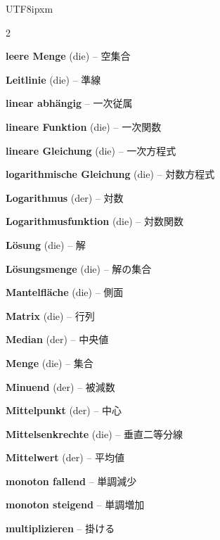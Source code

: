 \begin{CJK}{UTF8}{ipxm}
\begin{multicols}{2}
\par\nopagebreak
\textbf{leere Menge} (die) -- 空集合\dotfill\hyperref[e:104]{\pageref*{e:104}}\par
\textbf{Leitlinie} (die) -- 準線\dotfill\hyperref[e:318]{\pageref*{e:318}}\par
\textbf{linear abhängig} -- 一次従属\dotfill\hyperref[e:319]{\pageref*{e:319}}\par
\textbf{lineare Funktion} (die) -- 一次関数\dotfill\hyperref[e:119]{\pageref*{e:119}}\par
\textbf{lineare Gleichung} (die) -- 一次方程式\dotfill\hyperref[e:81]{\pageref*{e:81}}\par
\textbf{logarithmische Gleichung} (die) -- 対数方程式\dotfill\hyperref[e:85]{\pageref*{e:85}}\par
\textbf{Logarithmus} (der) -- 対数\dotfill\hyperref[e:95]{\pageref*{e:95}}\par
\textbf{Logarithmusfunktion} (die) -- 対数関数\dotfill\hyperref[e:131]{\pageref*{e:131}}\par
\textbf{Lösung} (die) -- 解\dotfill\hyperref[e:78]{\pageref*{e:78}}\par
\textbf{Lösungsmenge} (die) -- 解の集合\dotfill\hyperref[e:79]{\pageref*{e:79}}\par

\par\nopagebreak
\textbf{Mantelfläche} (die) -- 側面\dotfill\hyperref[e:250]{\pageref*{e:250}}\par
\textbf{Matrix} (die) -- 行列\dotfill\hyperref[e:320]{\pageref*{e:320}}\par
\textbf{Median} (der) -- 中央値\dotfill\hyperref[e:339]{\pageref*{e:339}}\par
\textbf{Menge} (die) -- 集合\dotfill\hyperref[e:96]{\pageref*{e:96}}\par
\textbf{Minuend} (der) -- 被減数\dotfill\hyperref[e:19]{\pageref*{e:19}}\par
\textbf{Mittelpunkt} (der) -- 中心\dotfill\hyperref[e:212]{\pageref*{e:212}}\par
\textbf{Mittelsenkrechte} (die) -- 垂直二等分線\dotfill\hyperref[e:170]{\pageref*{e:170}}\par
\textbf{Mittelwert} (der) -- 平均値\dotfill\hyperref[e:338]{\pageref*{e:338}}\par
\textbf{monoton fallend} -- 単調減少\dotfill\hyperref[e:143]{\pageref*{e:143}}\par
\textbf{monoton steigend} -- 単調増加\dotfill\hyperref[e:142]{\pageref*{e:142}}\par
\textbf{multiplizieren} -- 掛ける\dotfill\hyperref[e:21]{\pageref*{e:21}}\par


\end{multicols}
\end{CJK}
